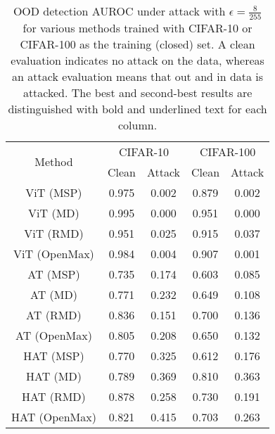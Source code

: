 
\begin{table}[ht]
    \centering
\caption{OOD detection AUROC under attack with \( \epsilon = \frac{8}{255} \) for various methods trained with CIFAR-10 or CIFAR-100 as the training (closed) set. A clean evaluation indicates no attack on the data, whereas an attack evaluation means that out and in data is attacked. The best and second-best results are distinguished with bold and underlined text for each column.}
    \renewcommand{\arraystretch}{1}\setlength{\tabcolsep}{20pt} \small %


    \begin{tabular}{ccccc}
    
    
        \toprule
       \multirow{2}{*}{Method} & \multicolumn{2}{c}{CIFAR-10} & \multicolumn{2}{c}{CIFAR-100} \\
        \cmidrule(lr){2-3} \cmidrule(lr){4-5}
         & Clean &  Attack & Clean & Attack \\
        \midrule
        ViT (MSP) & 0.975 & 0.002 & 0.879 & 0.002 \\
        ViT (MD) & 0.995  & 0.000 & 0.951  & 0.000 \\
        ViT (RMD) & 0.951 & 0.025 & 0.915 & 0.037 \\
        ViT (OpenMax) & 0.984 & 0.004 & 0.907 & 0.001 \\
        \midrule
        AT (MSP) & 0.735 & 0.174 & 0.603  & 0.085 \\
        AT (MD) & 0.771 & 0.232 & 0.649 & 0.108 \\
        AT (RMD) & 0.836 & 0.151 & 0.700 & 0.136 \\
        AT (OpenMax) & 0.805 & 0.208 & 0.650 & 0.132 \\
        \midrule
        HAT (MSP) & 0.770 & 0.325 & 0.612 & 0.176 \\
        HAT (MD) & 0.789  & 0.369 & 0.810 & 0.363 \\
        HAT (RMD) & 0.878 & 0.258 & 0.730 & 0.191 \\
        HAT (OpenMax) & 0.821 & 0.415 & 0.703 & 0.263 \\
        \bottomrule
    \end{tabular}
    \label{tab:in_distribution}
\end{table}

